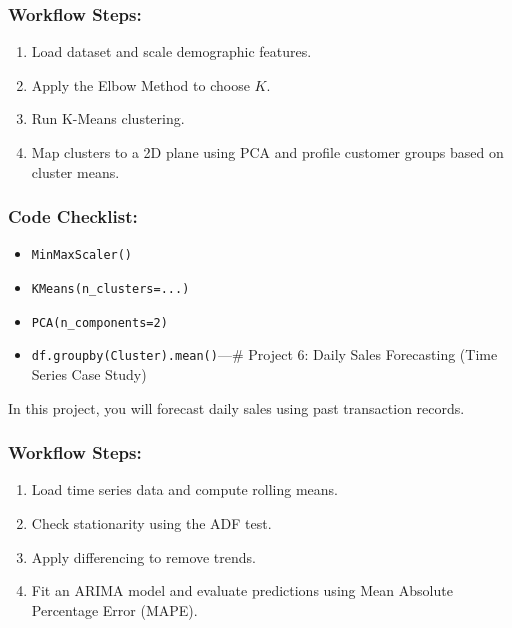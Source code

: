 \subsubsection{Workflow Steps:}\label{workflow-steps-4}

\begin{enumerate}
\def\labelenumi{\arabic{enumi}.}
\tightlist
\item
  Load dataset and scale demographic features.
\item
  Apply the Elbow Method to choose \(K\).
\item
  Run K-Means clustering.
\item
  Map clusters to a 2D plane using PCA and profile customer groups based
  on cluster means.
\end{enumerate}

\subsubsection{Code Checklist:}\label{code-checklist-4}

\begin{itemize}
\tightlist
\item
  \texttt{MinMaxScaler()}
\item
  \texttt{KMeans(n\_clusters=...)}
\item
  \texttt{PCA(n\_components=2)}
\item
  \texttt{df.groupby(\textquotesingle{}Cluster\textquotesingle{}).mean()}\n\n---\n\n\#
  Project 6: Daily Sales Forecasting (Time Series Case Study)
\end{itemize}

In this project, you will forecast daily sales using past transaction
records.

\subsubsection{Workflow Steps:}\label{workflow-steps-5}

\begin{enumerate}
\def\labelenumi{\arabic{enumi}.}
\tightlist
\item
  Load time series data and compute rolling means.
\item
  Check stationarity using the ADF test.
\item
  Apply differencing to remove trends.
\item
  Fit an ARIMA model and evaluate predictions using Mean Absolute
  Percentage Error (MAPE).
\end{enumerate}

